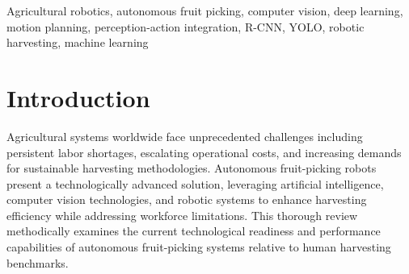\documentclass{ieeeaccess}
\begin{document}
\begin{keywords}
Agricultural robotics, autonomous fruit picking, computer vision, deep learning, motion planning, perception-action integration, R-CNN, YOLO, robotic harvesting, machine learning
\end{keywords}

\maketitle
\section{Introduction}
Agricultural systems worldwide face unprecedented challenges including persistent labor shortages, escalating operational costs, and increasing demands for sustainable harvesting methodologies. Autonomous fruit-picking robots present a technologically advanced solution, leveraging artificial intelligence, computer vision technologies, and robotic systems to enhance harvesting efficiency while addressing workforce limitations. This thorough review methodically examines the current technological readiness and performance capabilities of autonomous fruit-picking systems relative to human harvesting benchmarks.
\end{document}
